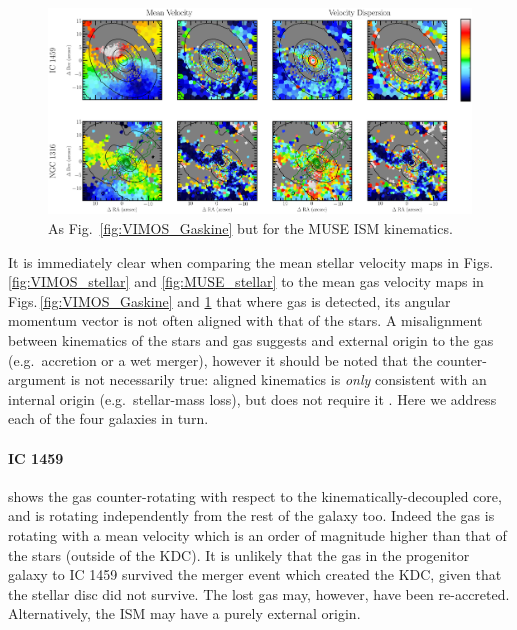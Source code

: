 	\begin{figure}
		\centering
		\includegraphics[height=0.31\textheight]{chapter5/muse/kin.png}
		\caption[MUSE ISM kinematic maps]{As Fig.\ \ref{fig:VIMOS_Gaskine} but for the MUSE ISM kinematics.}
		\label{fig:MUSE_Gaskine}
	\end{figure}


	It is immediately clear when comparing the mean stellar velocity maps in Figs.\,\ref{fig:VIMOS_stellar} and \ref{fig:MUSE_stellar} to the mean gas velocity maps in Figs.\,\ref{fig:VIMOS_Gaskine} and \ref{fig:MUSE_Gaskine} that where gas is detected, its angular momentum vector is not often aligned with that of the stars. A misalignment between kinematics of the stars and gas suggests and external origin to the gas (e.g.\ accretion or a wet merger), however it should be noted that the counter-argument is not necessarily true: aligned kinematics is \textit{only} consistent with an internal origin (e.g.\ stellar-mass loss), but does not require it \citep[e.g.][]{Davis2011a}. Here we address each of the four galaxies in turn. 

	\paragraph{IC 1459} shows the gas counter-rotating with respect to the kinematically-decoupled core, and is rotating independently from the rest of the galaxy too. Indeed the gas is rotating with a mean velocity which is an order of magnitude higher than that of the stars (outside of the KDC). It is unlikely that the gas in the progenitor galaxy to IC 1459 survived the merger event which created the KDC, given that the stellar disc did not survive. The lost gas may, however, have been re-accreted. Alternatively, the ISM may have a purely external origin. 

